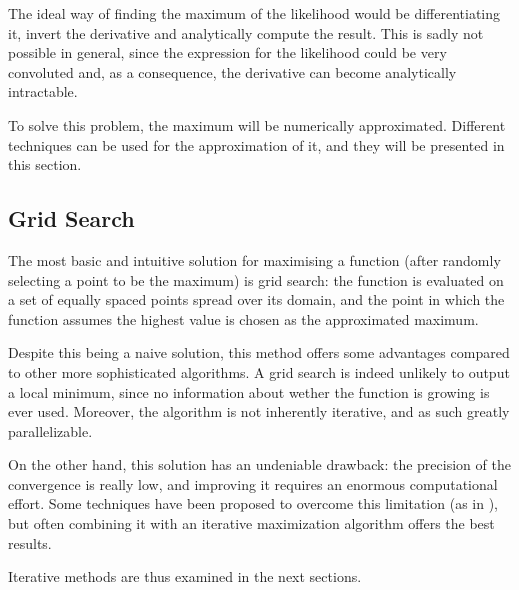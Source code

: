 The ideal way of finding the maximum of the likelihood would be differentiating it,
invert the derivative and analytically compute the result.
This is sadly not possible in general,
since the expression for the likelihood could be very convoluted and,
as a consequence,
the derivative can become analytically intractable.

To solve this problem,
the maximum will be numerically approximated.
Different techniques can be used for the approximation of it,
and they will be presented in this section.

\subsection{Grid Search}
\label{sec:grid_search}

The most basic and intuitive solution for maximising a function (after randomly selecting a point to be the maximum) is grid search:
the function is evaluated on a set of equally spaced points spread over its domain,
and the point in which the function assumes the highest value is chosen as the approximated maximum.

Despite this being a naive solution,
this method offers some advantages compared to other more sophisticated algorithms.
A grid search is indeed unlikely to output a local minimum,
since no information about wether the function is growing is ever used.
Moreover, the algorithm is not inherently iterative,
and as such greatly parallelizable.

On the other hand,
this solution has an undeniable drawback:
the precision of the convergence is really low,
and improving it requires an enormous computational effort.
Some techniques have been proposed to overcome this limitation
(as in \cite{pathak2024randomizedgridsearchhyperparametertuning,poštuvan2022adagridadaptivegridsearch}),
but often combining it with an iterative maximization algorithm offers the best results.

Iterative methods are thus examined in the next sections.


